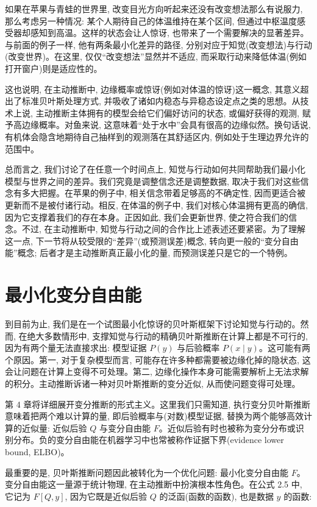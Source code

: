 如果在苹果与青蛙的世界里, 改变目光方向听起来还没有改变想法那么有说服力, 那么考虑另一种情况: 某个人期待自己的体温维持在某个区间, 但通过中枢温度感受器却感知到高温。这样的状态会让人惊讶, 也带来了一个需要解决的显著差异。与前面的例子一样, 他有两条最小化差异的路径, 分别对应于知觉(改变想法)与行动(改变世界)。在这里, 仅仅``改变想法''显然并不适应, 而采取行动来降低体温(例如打开窗户)则是适应性的。

这也说明, 在主动推断中, 边缘概率或惊讶(例如对体温的惊讶)这一概念, 其意义超出了标准贝叶斯处理方式, 并吸收了诸如内稳态与异稳态设定点之类的思想。从技术上说, 主动推断主体拥有的模型会给它们偏好访问的状态, 或偏好获得的观测, 赋予高边缘概率。对鱼来说, 这意味着``处于水中''会具有很高的边缘似然。换句话说, 有机体会隐含地期待自己抽样到的观测落在其舒适区内, 例如处于生理边界允许的范围中。

总而言之, 我们讨论了在任意一个时间点上, 知觉与行动如何共同帮助我们最小化模型与世界之间的差异。我们究竟是调整信念还是调整数据, 取决于我们对这些信念有多大把握。在苹果的例子中, 相关信念带着足够高的不确定性, 因而更适合被更新而不是被付诸行动。相反, 在体温的例子中, 我们对核心体温拥有更高的确信, 因为它支撑着我们的存在本身。正因如此, 我们会更新世界, 使之符合我们的信念。不过, 在主动推断中, 知觉与行动之间的合作比上述表述还要紧密。为了理解这一点, 下一节将从较受限的``差异''(或预测误差)概念, 转向更一般的``变分自由能''概念; 后者才是主动推断真正最小化的量, 而预测误差只是它的一个特例。

\section{最小化变分自由能}

到目前为止, 我们是在一个试图最小化惊讶的贝叶斯框架下讨论知觉与行动的。然而, 在绝大多数情形中, 支撑知觉与行动的精确贝叶斯推断在计算上都是不可行的, 因为有两个量无法直接求出: 模型证据 $P(y)$ 与后验概率 $P(x \mid y)$。这可能有两个原因。第一, 对于复杂模型而言, 可能存在许多种都需要被边缘化掉的隐状态, 这会让问题在计算上变得不可处理。第二, 边缘化操作本身可能需要解析上无法求解的积分。主动推断诉诸一种对贝叶斯推断的变分近似, 从而使问题变得可处理。

第 4 章将详细展开变分推断的形式主义。这里我们只需知道, 执行变分贝叶斯推断意味着把两个难以计算的量, 即后验概率与(对数)模型证据, 替换为两个能够高效计算的近似量: 近似后验 $Q$ 与变分自由能 $F$。近似后验有时也被称为变分分布或识别分布。负的变分自由能在机器学习中也常被称作证据下界(evidence lower bound, ELBO)。

最重要的是, 贝叶斯推断问题因此被转化为一个优化问题: 最小化变分自由能 $F$。变分自由能这一量源于统计物理, 在主动推断中扮演根本性角色。在公式 2.5 中, 它记为 $F[Q, y]$, 因为它既是近似后验 $Q$ 的泛函(函数的函数), 也是数据 $y$ 的函数:

